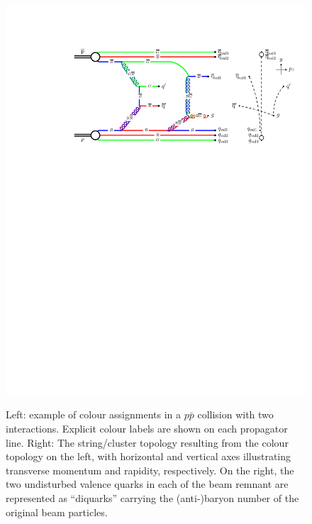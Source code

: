 \begin{figure}
\begin{center}
\includegraphics*[scale=0.7]{minim-bias/mb-col1}\\
\caption{Left: example of colour assignments in a $p\bar{p}$ collision with two
  interactions. Explicit colour labels are shown on each propagator
  line. Right: The string/cluster topology resulting from the colour
  topology on the left, with horizontal and vertical axes
  illustrating transverse momentum and rapidity, respectively. On the
  right, the two undisturbed valence quarks in each of the beam
  remnant are represented as ``diquarks'' carrying the (anti-)baryon
  number of the original beam particles. \label{fig:justring}}
\end{center}
\end{figure}

